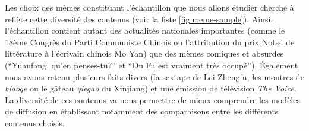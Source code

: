 \begin{figure}[h]
    \hspace{\fill}
    \hspace{\fill}%
    \hspace{\fill}%
    \caption{}
    \label{}
\end{figure}


Les choix des mèmes constituant l'échantillon que nous allons étudier cherche à reflète cette diversité des contenus (voir la liste \ref{fig:meme-sample}). Ainsi, l'échantillon contient autant des actualités nationales importantes (comme le 18ème Congrès du Parti Communiste Chinois ou l'attribution du prix Nobel de littérature à l'écrivain chinois Mo Yan) que des mèmes comiques et absurdes (``Yuanfang, qu'en penses-tu?'' et ``Du Fu est vraiment très occupé''). Également, nous avons retenu plusieurs faits divers (la sextape de Lei Zhengfu, les montres de \textit{biaoge} ou le gâteau \textit{qiegao} du Xinjiang) et une émission de télévision \textit{The Voice}. La diversité de ces contenus va nous permettre de mieux comprendre les modèles de diffusion en établissant notamment des comparaisons entre les différents contenus choisis.




